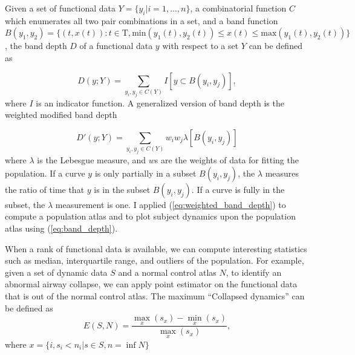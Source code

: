 Given a set of functional data $Y=\{y_i | i=1,...,n\}$, a combinatorial function $C$ which enumerates all two pair combinations in a set, and a band function $B(y_1, y_2) = \{(t,x(t)): t\in \mathrm{T}, \mathrm{min}(y_1(t),y_2(t)) \leq x(t) \leq \mathrm{max}(y_1(t),y_2(t))\}$,
the band depth $D$ of a functional data $y$ with respect to a set $Y$ can be defined as

\begin{equation}
D(y; Y) = \sum_{y_i, y_j \in C(Y)} I[y \subset B(y_i, y_j)],
\label{eq:band_depth}
\end{equation}
where $I$ is an indicator function.
A generalized version of band depth is the weighted modified band depth

\begin{equation}
D'(y; Y) = \sum_{y_i, y_j \in C(Y)} w_iw_j\lambda[ B(y_i, y_j) ]
\label{eq:weighted_band_depth}
\end{equation}
where $\lambda$ is the Lebesgue measure, and $w$s are the weights of data for fitting the population.
If a curve $y$ is only partially in a subset $B(y_i,y_j)$, the $\lambda$ measures the ratio of time that $y$ is in the subset $B(y_i,y_j)$.
If a curve is fully in the subset, the $\lambda$ measurement is one.
I applied (\ref{eq:weighted_band_depth}) to compute a population atlas and to plot subject dynamics upon the population atlas using (\ref{eq:band_depth}).

When a rank of functional data is available, we can compute interesting statistics such as median, interquartile range, and outliers of the population.
For example, given a set of dynamic data $S$ and a normal control atlas $N$, to identify an abnormal airway collapse, we can apply point estimator on the functional data that is out of the normal control atlas.
The maximum ``Collapsed dynamics'' can be defined as
\begin{equation}
E(S, N) = \frac{\max_x(s_x)-\min_x(s_x)}{\max_x(s_x)},
\label{eq:collapsed_dynamics}
\end{equation}
where $x=\{i, s_i < n_i | s \in S, n = \inf N \}$